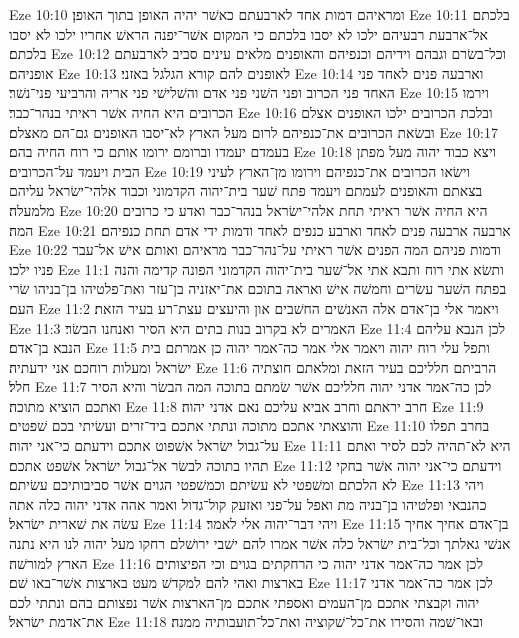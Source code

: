 Eze 10:10  ומראיהם דמות אחד לארבעתם כאשׁר יהיה האופן בתוך האופן׃
Eze 10:11  בלכתם אל־ארבעת רבעיהם ילכו לא יסבו בלכתם כי המקום אשׁר־יפנה הראשׁ אחריו ילכו לא יסבו בלכתם׃
Eze 10:12  וכל־בשׂרם וגבהם וידיהם וכנפיהם והאופנים מלאים עינים סביב לארבעתם אופניהם׃
Eze 10:13  לאופנים להם קורא הגלגל באזני׃
Eze 10:14  וארבעה פנים לאחד פני האחד פני הכרוב ופני השׁני פני אדם והשׁלישׁי פני אריה והרביעי פני־נשׁר׃
Eze 10:15  וירמו הכרובים היא החיה אשׁר ראיתי בנהר־כבר׃
Eze 10:16  ובלכת הכרובים ילכו האופנים אצלם ובשׂאת הכרובים את־כנפיהם לרום מעל הארץ לא־יסבו האופנים גם־הם מאצלם׃
Eze 10:17  בעמדם יעמדו וברומם ירומו אותם כי רוח החיה בהם׃
Eze 10:18  ויצא כבוד יהוה מעל מפתן הבית ויעמד על־הכרובים׃
Eze 10:19  וישׂאו הכרובים את־כנפיהם וירומו מן־הארץ לעיני בצאתם והאופנים לעמתם ויעמד פתח שׁער בית־יהוה הקדמוני וכבוד אלהי־ישׂראל עליהם מלמעלה׃
Eze 10:20  היא החיה אשׁר ראיתי תחת אלהי־ישׂראל בנהר־כבר ואדע כי כרובים המה׃
Eze 10:21  ארבעה ארבעה פנים לאחד וארבע כנפים לאחד ודמות ידי אדם תחת כנפיהם׃
Eze 10:22  ודמות פניהם המה הפנים אשׁר ראיתי על־נהר־כבר מראיהם ואותם אישׁ אל־עבר פניו ילכו׃
Eze 11:1  ותשׂא אתי רוח ותבא אתי אל־שׁער בית־יהוה הקדמוני הפונה קדימה והנה בפתח השׁער עשׂרים וחמשׁה אישׁ ואראה בתוכם את־יאזניה בן־עזר ואת־פלטיהו בן־בניהו שׂרי העם׃
Eze 11:2  ויאמר אלי בן־אדם אלה האנשׁים החשׁבים און והיעצים עצת־רע בעיר הזאת׃
Eze 11:3  האמרים לא בקרוב בנות בתים היא הסיר ואנחנו הבשׂר׃
Eze 11:4  לכן הנבא עליהם הנבא בן־אדם׃
Eze 11:5  ותפל עלי רוח יהוה ויאמר אלי אמר כה־אמר יהוה כן אמרתם בית ישׂראל ומעלות רוחכם אני ידעתיה׃
Eze 11:6  הרביתם חלליכם בעיר הזאת ומלאתם חוצתיה חלל׃
Eze 11:7  לכן כה־אמר אדני יהוה חלליכם אשׁר שׂמתם בתוכה המה הבשׂר והיא הסיר ואתכם הוציא מתוכה׃
Eze 11:8  חרב יראתם וחרב אביא עליכם נאם אדני יהוה׃
Eze 11:9  והוצאתי אתכם מתוכה ונתתי אתכם ביד־זרים ועשׂיתי בכם שׁפטים׃
Eze 11:10  בחרב תפלו על־גבול ישׂראל אשׁפוט אתכם וידעתם כי־אני יהוה׃
Eze 11:11  היא לא־תהיה לכם לסיר ואתם תהיו בתוכה לבשׂר אל־גבול ישׂראל אשׁפט אתכם׃
Eze 11:12  וידעתם כי־אני יהוה אשׁר בחקי לא הלכתם ומשׁפטי לא עשׂיתם וכמשׁפטי הגוים אשׁר סביבותיכם עשׂיתם׃
Eze 11:13  ויהי כהנבאי ופלטיהו בן־בניה מת ואפל על־פני ואזעק קול־גדול ואמר אהה אדני יהוה כלה אתה עשׂה את שׁארית ישׂראל׃
Eze 11:14  ויהי דבר־יהוה אלי לאמר׃
Eze 11:15  בן־אדם אחיך אחיך אנשׁי גאלתך וכל־בית ישׂראל כלה אשׁר אמרו להם ישׁבי ירושׁלם רחקו מעל יהוה לנו היא נתנה הארץ למורשׁה׃
Eze 11:16  לכן אמר כה־אמר אדני יהוה כי הרחקתים בגוים וכי הפיצותים בארצות ואהי להם למקדשׁ מעט בארצות אשׁר־באו שׁם׃
Eze 11:17  לכן אמר כה־אמר אדני יהוה וקבצתי אתכם מן־העמים ואספתי אתכם מן־הארצות אשׁר נפצותם בהם ונתתי לכם את־אדמת ישׂראל׃
Eze 11:18  ובאו־שׁמה והסירו את־כל־שׁקוציה ואת־כל־תועבותיה ממנה׃
